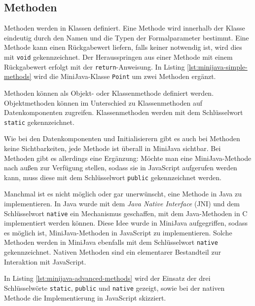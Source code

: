 

\subsection{Methoden}
\label{subsec:MiniJava-Methoden}

Methoden werden in Klassen definiert. Eine Methode wird innerhalb der Klasse eindeutig durch den Namen und die Typen der Formalparameter bestimmt. Eine Methode kann einen Rückgabewert liefern, falls keiner notwendig ist, wird dies mit \lstinline{void} gekennzeichnet. Der Herausspringen aus einer Methode mit einem Rückgabewert erfolgt mit der \lstinline{return}-Anweisung. In Listing \ref{lst:minijava-simple-methods} wird die MiniJava-Klasse \lstinline{Point} um zwei Methoden ergänzt.



Methoden können als Objekt- oder Klassenmethode definiert werden. Objektmethoden können im Unterschied zu Klassenmethoden auf Datenkomponenten zugreifen. Klassenmethoden werden mit dem Schlüsselwort \lstinline{static} gekennzeichnet.

Wie bei den Datenkomponenten und Initialisierern gibt es auch bei Methoden keine Sichtbarkeiten, jede Methode ist überall in MiniJava sichtbar. Bei Methoden gibt es allerdings eine Ergänzung: Möchte man eine MiniJava-Methode nach außen zur Verfügung stellen, sodass sie in JavaScript aufgerufen werden kann, muss diese mit dem Schlüsselwort \lstinline{public} gekennzeichnet werden.

Manchmal ist es nicht möglich oder gar unerwünscht, eine Methode in Java zu implementieren. In Java wurde mit dem \emph{Java Native Interface} (JNI) \cite{JNI8} und dem Schlüsselwort \lstinline{native} ein Mechanismus geschaffen, mit dem Java-Methoden in C implementiert werden können. Diese Idee wurde in MiniJava aufgegriffen, sodass es möglich ist, MiniJava-Methoden in JavaScript zu implementieren. Solche Methoden werden in MiniJava ebenfalls mit dem Schlüsselwort \lstinline{native} gekennzeichnet. Nativen Methoden sind ein elementarer Bestandteil zur Interaktion mit JavaScript.

In Listing \ref{lst:minijava-advanced-methods} wird der Einsatz der drei Schlüsselwörte \lstinline{static}, \lstinline{public} und \lstinline{native} gezeigt, sowie bei der nativen Methode die Implementierung in JavaScript skizziert.

